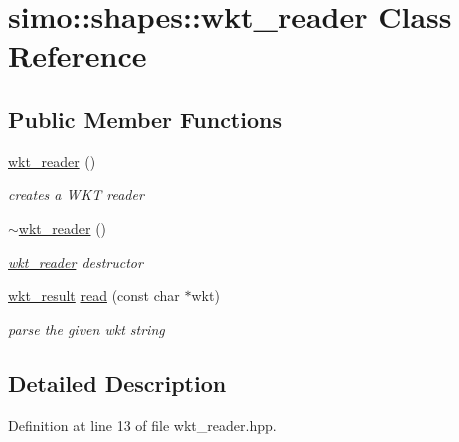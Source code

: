 \hypertarget{classsimo_1_1shapes_1_1wkt__reader}{\section{simo\-:\-:shapes\-:\-:wkt\-\_\-reader Class Reference}
\label{classsimo_1_1shapes_1_1wkt__reader}
}
\subsection*{Public Member Functions}
\begin{DoxyCompactItemize}
\item 
\hyperlink{classsimo_1_1shapes_1_1wkt__reader_a140190108a9314b118e271f251d5e3d8}{wkt\-\_\-reader} ()
\begin{DoxyCompactList}\small\item\em creates a W\-K\-T reader \end{DoxyCompactList}\item 
\hypertarget{classsimo_1_1shapes_1_1wkt__reader_a495f804e3972958ec98bfe00985cde2c}{\hyperlink{classsimo_1_1shapes_1_1wkt__reader_a495f804e3972958ec98bfe00985cde2c}{$\sim$wkt\-\_\-reader} ()}\label{classsimo_1_1shapes_1_1wkt__reader_a495f804e3972958ec98bfe00985cde2c}

\begin{DoxyCompactList}\small\item\em \hyperlink{classsimo_1_1shapes_1_1wkt__reader}{wkt\-\_\-reader} destructor \end{DoxyCompactList}\item 
\hyperlink{structsimo_1_1shapes_1_1wkt__result}{wkt\-\_\-result} \hyperlink{classsimo_1_1shapes_1_1wkt__reader_a2975dda35cd727ed6f1ad338d0a58861}{read} (const char $\ast$wkt)
\begin{DoxyCompactList}\small\item\em parse the given wkt string \end{DoxyCompactList}\end{DoxyCompactItemize}


\subsection{Detailed Description}


Definition at line 13 of file wkt\-\_\-reader.\-hpp.



